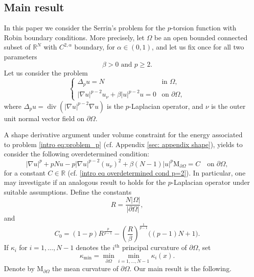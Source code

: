 \documentclass[10pt,a4paper]{amsart}
\numberwithin{equation}{section}
\newcommand{\R}{\mathbb{R}}
\renewcommand{\div}{\operatorname{div}}
\begin{document}
\subsection{Main result}

In this paper we consider the Serrin’s problem for
the $p$-torsion function with Robin boundary conditions. More precisely, let $\Omega$ be an open bounded connected subset of $\R^N$ with $C^{2,\alpha}$ boundary, for $\alpha \in (0,1)$, and let us fix once for all two parameters
\[
\beta >  0 \text{ and } p \geq 2.
\]
Let us consider the problem
\begin{equation} \label{intro eq:problem_p}
    \begin{cases}
    \Delta_p u = N & \text{in } \Omega, \\
    |\nabla u|^{p-2} u_\nu  + \beta |u|^{p-2}u = 0 & \text{on } \partial\Omega,
    \end{cases}
\end{equation}
where $\Delta_p u = \div(|\nabla u|^{p-2}\nabla u)$ is the $p$-Laplacian operator, and $\nu$ is the outer unit normal vector field on $\partial\Omega$. 

A shape derivative argument under volume constraint for the energy associated to problem \eqref{intro eq:problem_p} (cf. Appendix \ref{sec: appendix shape}), yields to consider the following overdetermined condition:
\begin{equation}\label{intro eq overdetermined cond p}
   |\nabla u|^p + pNu - p |\nabla u|^{p-2} (u_\nu)^2 + \beta(N-1) |u|^p \mathrm{M}_{\partial\Omega} = C  \quad\text{on } \partial\Omega,
\end{equation}
for a constant $C\in \R$ (cf. \eqref{intro eq overdetermined cond p=2}). In particular, one may investigate if an analogous result to \cite[Thm. 1]{gamo26} holds for the $p$-Laplacian operator under suitable assumptions.
Define the constants
\begin{equation}\label{intro eq R}
        R = \frac{N|\Omega|}{|\partial\Omega|}, 
\end{equation}
and 
\begin{equation}\label{intro eq C0}
C_0 = (1-p)R^{\frac{p}{p-1}} - \left( \frac{R}{\beta} \right)^{\frac{1}{p-1}} \big( (p-1)N + 1 \big).    
\end{equation}
If $\kappa_i$ for $i=1, \dots,N-1$ denotes the $i^{\text{th}}$ principal curvature of $\partial \Omega$, set
\begin{equation}\label{intro k min}
    \kappa_{\min} = \min_{\partial \Omega} \min_{i=1,\dots,N-1}  \kappa_i(x).
\end{equation}
Denote by $\mathrm{M}_{\partial\Omega}$ the mean curvature of $\partial \Omega$. Our main result is the following.
\end{document}
